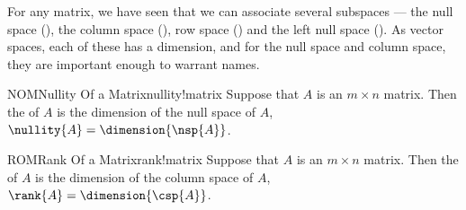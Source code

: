 %
%
%
For any matrix, we have seen that we can associate several subspaces --- the null space (), the column space (), row space () and the left null space  ().  As vector spaces, each of these has a dimension, and for the null space and column space, they are important enough to warrant names. %
%
\begin{definition}{NOM}{Nullity Of a Matrix}{nullity!matrix}
Suppose that $A$ is an $m\times n$ matrix.  Then the  of $A$ is the dimension of the null space of $A$, $\nullity{A}=\dimension{\nsp{A}}$.
\end{definition}
%
\begin{definition}{ROM}{Rank Of a Matrix}{rank!matrix}
Suppose that $A$ is an $m\times n$ matrix.  Then the  of $A$ is the dimension of the column space of $A$, $\rank{A}=\dimension{\csp{A}}$.
\end{definition}
%
